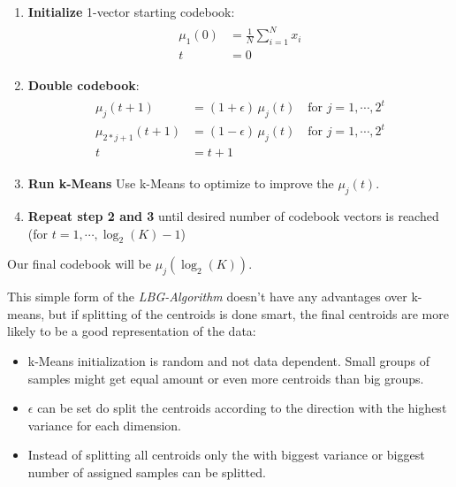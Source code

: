 \begin{enumerate}
\item \textbf{Initialize} 1-vector starting codebook:
	\begin{align}
	\begin{split}
	\mu_1(0) &= \frac{1}{N} \sum\limits_{i=1}^N x_i\\
	t &= 0
	\end{split}
	\end{align}
\item \textbf{Double codebook}:
	\begin{align}
	\begin{split}
	\mu_j(t+1) &= (1+\epsilon)\, \mu_j(t) \quad \text{for } j=1,\cdots,2^t\\
	\mu_{2*j+1}(t+1) &= (1-\epsilon)\, \mu_j(t) \quad \text{for } j=1,\cdots,2^t\\
	t &= t+1
	\end{split}
	\end{align}
\item \textbf{Run k-Means} Use k-Means to optimize to improve the $\mu_j(t)$.
\item \textbf{Repeat step 2 and 3} until desired number of codebook vectors is reached (for $t=1,\cdots,\log_2(K)-1$)
\end{enumerate}

Our final codebook will be $\mu_j(\log_2(K))$.

This simple form of the \emph{LBG-Algorithm} doesn't have any advantages over k-means, but if splitting of the centroids is done smart, the final centroids are more likely to be a good representation of the data:
\begin{itemize}
\item k-Means initialization is random and not data dependent. Small groups of samples might get equal amount or even more centroids than big groups.
\item $\epsilon$ can be set do split the centroids according to the direction with the highest variance for each dimension.
\item Instead of splitting all centroids only the  with biggest variance or biggest number of assigned samples can be splitted.
\end{itemize}
